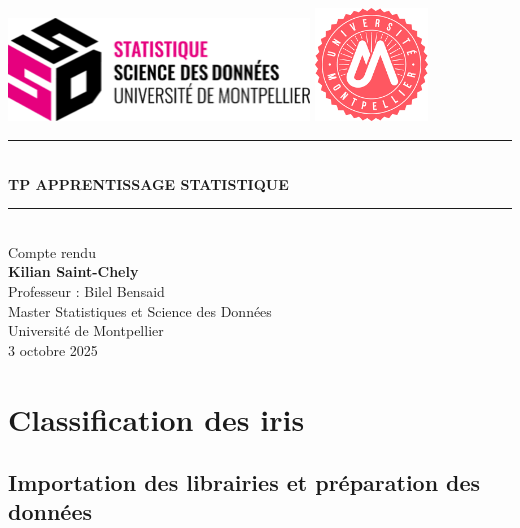 \documentclass{book}
\newcommand{\HRule}[1]{\rule{\linewidth}{#1}}
\begin{document}
\begin{titlepage}

    \includegraphics[width=8cm]{photo.png} \hfill
    \includegraphics[width=3cm]{logo.png}

    \vspace{4cm}

    \begin{center}
        \HRule{1.5pt} \\[0.4cm]
        {\LARGE \textbf{\uppercase{TP Apprentissage statistique}}} \\[0.4cm]
        \HRule{2pt} \\[0.6cm]
        {\Large Compte rendu} \\[6cm]



        \textbf{Kilian Saint-Chely} \\[0.5cm]
        Professeur : Bilel Bensaid \\[0.3cm]
        Master Statistiques et Science des Données \\[0.3cm]
        Université de Montpellier \\[2cm]

        {\large 3 octobre 2025}
    \end{center}
\end{titlepage}
\tableofcontents
\newpage


\chapter{Classification des iris}

\section{Importation des librairies et préparation des données}
\end{document}
